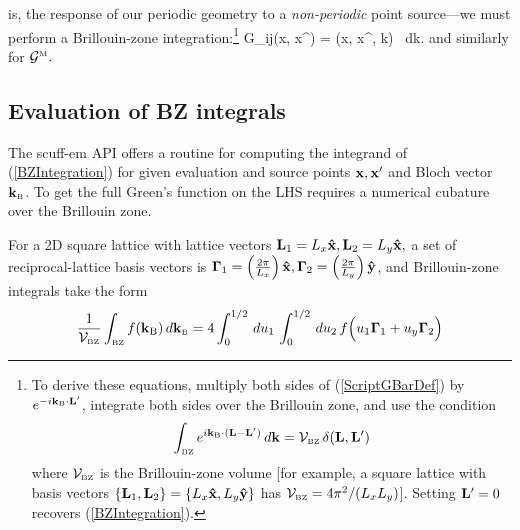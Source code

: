 \documentclass[letterpaper]{article}
\newcommand{\vbGamma}{\boldsymbol{\Gamma}}
\begin{document}
is, the response of our periodic geometry to a \textit{non-periodic}
point source---we must perform a Brillouin-zone 
integration:\footnote{To derive these equations, multiply both sides
of (\ref{ScriptGBarDef}) by $e^{-i\mathbf{k}_{\hbox{\tiny{B}}} \cdot \mathbf{L}^\prime}$,
integrate both sides over the Brillouin zone, and use the
condition 
$$\int_{\hbox{\tiny{BZ}}} e^{i\mathbf{k}_{\hbox{\tiny{B}}}\cdot (\mathbf{L}-\mathbf{L}^\prime)}\,d\mathbf{k}
  =\mathcal{V}_{\hbox{\tiny{BZ}}} \, \delta(\mathbf{L},\mathbf{L}^\prime)
$$
where $\mathcal{V}_{\hbox{\tiny{BZ}}}$ is the Brillouin-zone volume [for example,
a square lattice with basis vectors
$\{\mathbf{L}_1, \mathbf{L}_2\}=\{L_x\mathbf{\hat x}, L_y\mathbf{\hat y}\}$ has
$\mathcal{V}_{\hbox{\tiny{BZ}}}=4\pi^2/(L_x L_y)$].
Setting $\mathbf{L}^\prime=0$ recovers (\ref{BZIntegration}).}
{
  \mc G_{ij}(\vb x, \vb x^\prime)
 = 
   \int{} 
   (\vb x, \vb x^\prime, \vb k)
   \, d\vb k.
}
and similarly for $\mathcal{G}^{\hbox{\tiny{M}}}.$

\subsection*{Evaluation of BZ integrals}

The {\sc scuff-em} API offers a routine for computing the integrand of
(\ref{BZIntegration}) for given evaluation and source points
$\mathbf{x}, \mathbf{x}^\prime$ and Bloch vector $\mathbf{k}_{\hbox{\tiny{B}}}$. To get the 
full Green's function on the LHS requires a numerical cubature
over the Brillouin zone.

For a 2D square lattice with lattice vectors 
$\mathbf{L}_1=L_x\mathbf{\hat x}, \mathbf{L}_2=L_y\mathbf{\hat x},$
a set of reciprocal-lattice basis vectors is 
$\vbGamma_1=\pf{2\pi}{L_x} \vbhat{x},
 \vbGamma_2=\pf{2\pi}{L_y} \vbhat{y}$,
and Brillouin-zone integrals take the form
$$ \frac{1}{\mc V\subt{BZ}} 
   \int\subt{BZ} f(\vb k\subs{B}) \, d \vb k\subt{B}
  =4\int_0^{1/2} \, d u_1 \, \int_0^{1/2} \, d u_2 \, 
   f\Big( u_1\vbGamma_1 + u_y\vbGamma_2 \Big)
$$

\newpage
\end{document}
